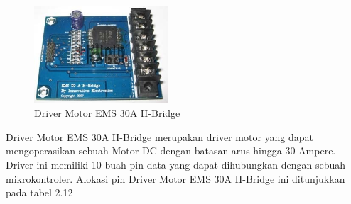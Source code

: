 	\begin{figure}[H]
	\centering
	\includegraphics[width=5cm]{gambar/driver_motor.jpg}
	\caption{Driver Motor EMS 30A H-Bridge}
	\end{figure}

Driver Motor EMS 30A H-Bridge merupakan driver motor yang dapat mengoperasikan sebuah Motor DC dengan batasan arus hingga 30 Ampere. Driver ini memiliki 10 buah pin data yang dapat dihubungkan dengan sebuah mikrokontroler. Alokasi pin Driver Motor EMS 30A H-Bridge ini ditunjukkan pada tabel 2.12
